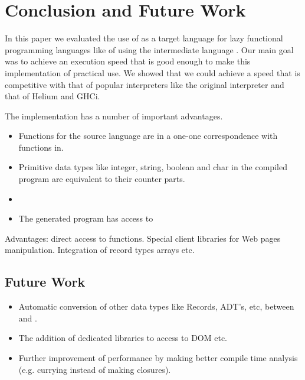 \section{Conclusion and Future Work}\label{sapljs:sec:conclusions}
In this paper we evaluated the use of \JS as a target language for lazy functional programming languages like \Haskell of \Clean using the intermediate language \Sapl.
Our main goal was to achieve an execution speed that is good enough to make this implementation of practical use. We showed that we could achieve a speed that is competitive with that of popular interpreters like the original \Sapl interpreter and that of Helium and GHCi.

The implementation has a number of important advantages. 
\begin{itemize}
\item Functions for the source language are in a one-one correspondence with functions in\JS.
\item Primitive data types like integer, string, boolean and char in the compiled program are equivalent to their \JS counter parts.
\item  
\item The generated program has access to 
\end{itemize}

Advantages: direct access to \JS functions. Special client libraries for Web pages manipulation.
Integration of record types arrays etc.
\subsection{Future Work}
\begin{itemize}
\item Automatic conversion of other data types like Records, ADT's, etc, between \Sapl and \JS.
\item The addition of dedicated libraries to access to DOM etc.
\item Further improvement of performance by making better compile time analysis (e.g. \JS currying instead of making closures).
\end{itemize}